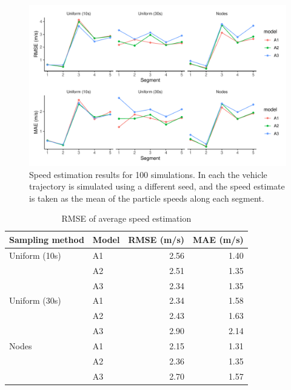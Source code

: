 \begin{knitrout}\small
{}\color{fgcolor}\begin{figure}
\includegraphics[width=\maxwidth]{figure/sim2_pf_full-1} \caption[Speed estimation results for 100 simulations]{Speed estimation results for 100 simulations. In each the vehicle trajectory is simulated using a different seed, and the speed estimate is taken as the mean of the particle speeds along each segment.}\label{fig:sim2_pf_full}
\end{figure}

\begin{table}

\caption{\label{tab:sim2_pf_full}RMSE of average speed estimation}
\centering
\fontsize{8}{10}\selectfont
\begin{tabular}[t]{llrr}
\toprule
Sampling method & Model & RMSE (m/s) & MAE (m/s)\\
\midrule
Uniform (10s) & A1 & 2.56 & 1.40\\
 & A2 & 2.51 & 1.35\\
 & A3 & 2.34 & 1.35\\
\midrule
Uniform (30s) & A1 & 2.34 & 1.58\\
 & A2 & 2.43 & 1.63\\
 & A3 & 2.90 & 2.14\\
\midrule
Nodes & A1 & 2.15 & 1.31\\
 & A2 & 2.36 & 1.35\\
 & A3 & 2.70 & 1.57\\
\bottomrule
\end{tabular}
\end{table}


\end{knitrout}



